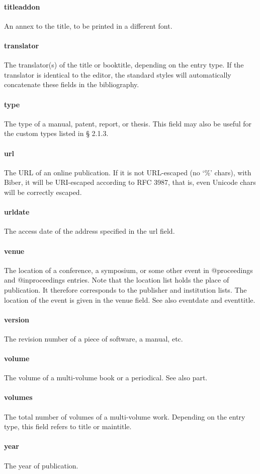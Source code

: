 \documentclass[a4paper,12pt]{report}
\begin{document}
\paragraph{titleaddon}
An annex to the title, to be printed in a different font.

\paragraph{translator}
The translator(s) of the title or booktitle, depending on the entry type. If the translator
is identical to the editor, the standard styles will automatically concatenate these fields in
the bibliography.

\paragraph{type}
The type of a manual, patent, report, or thesis. This field may also be useful for the
custom types listed in § 2.1.3.

\paragraph{url}
The URL of an online publication. If it is not URL-escaped (no ‘\%’ chars), with Biber, it
will be URI-escaped according to RFC 3987, that is, even Unicode chars will be correctly
escaped.

\paragraph{urldate}
The access date of the address specified in the url field.

\paragraph{venue}
The location of a conference, a symposium, or some other event in @proceedings and
@inproceedings entries. Note that the location list holds the place of publication. It therefore corresponds to the
publisher and institution lists. The location of the event is given in the venue field. See
also eventdate and eventtitle.

\paragraph{version}
The revision number of a piece of software, a manual, etc.

\paragraph{volume}
The volume of a multi-volume book or a periodical. See also part.

\paragraph{volumes}
The total number of volumes of a multi-volume work. Depending on the entry type, this
field refers to title or maintitle.

\paragraph{year}
The year of publication.
\end{document}
